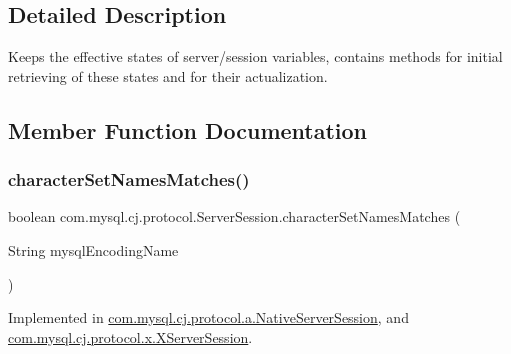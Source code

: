 \subsection{Detailed Description}
Keeps the effective states of server/session variables, contains methods for initial retrieving of these states and for their actualization. 

\subsection{Member Function Documentation}
\mbox{\label{interfacecom_1_1mysql_1_1cj_1_1protocol_1_1_server_session_a17bf8c1aa6316e1a1db91c7b00ebee86}} 
\subsubsection{\texorpdfstring{character\+Set\+Names\+Matches()}{characterSetNamesMatches()}}
{\footnotesize\ttfamily boolean com.\+mysql.\+cj.\+protocol.\+Server\+Session.\+character\+Set\+Names\+Matches (\begin{DoxyParamCaption}\item[{String}]{mysql\+Encoding\+Name }\end{DoxyParamCaption})}



Implemented in \mbox{\hyperlink{classcom_1_1mysql_1_1cj_1_1protocol_1_1a_1_1_native_server_session_a36b26698c0ac9c2f0935c2173e11297b}{com.\+mysql.\+cj.\+protocol.\+a.\+Native\+Server\+Session}}, and \mbox{\hyperlink{classcom_1_1mysql_1_1cj_1_1protocol_1_1x_1_1_x_server_session_af9937bac8e0266eeea9e7cb23a0b37d0}{com.\+mysql.\+cj.\+protocol.\+x.\+X\+Server\+Session}}.

\mbox{\label{interfacecom_1_1mysql_1_1cj_1_1protocol_1_1_server_session_abcad1a4dec7e1822b0d4c52fdb0feb7d}} 
